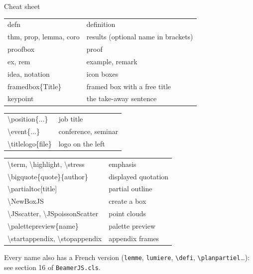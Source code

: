 \documentclass[night,charter,footer]{BeamerJS}
\begin{document}
\begin{frame}[allowframebreaks]{Cheat sheet}
	\small
	\par
		\begin{tabular}{@{}>{\ttfamily\small}l l@{}}
			defn & definition \\
			thm, prop, lemma, coro & results (optional name in brackets) \\
			proofbox & proof \\
			ex, rem & example, remark \\
			idea, notation & icon boxes \\
			framedbox\{Title\} & framed box with a free title \\
			keypoint & the take-away sentence \\
		\end{tabular}
	\medskip

	\par
		\begin{tabular}{@{}>{\ttfamily\small}l l@{}}
			\textbackslash position\{...\} & job title \\
			\textbackslash event\{...\} & conference, seminar \\
			\textbackslash titlelogo\{file\} & logo on the left \\
		\end{tabular}
	\medskip

	\framebreak

	\par
		\begin{tabular}{@{}>{\ttfamily\small}l l@{}}
			\textbackslash term, \textbackslash highlight, \textbackslash stress
				& emphasis \\
			\textbackslash bigquote\{quote\}\{author\} & displayed quotation \\
			\textbackslash partialtoc[title] & partial outline \\
			\textbackslash NewBoxJS & create a box \\
			\textbackslash JSscatter, \textbackslash JSpoissonScatter & point clouds \\
			\textbackslash palettepreview\{name\} & palette preview \\
			\textbackslash startappendix, \textbackslash stopappendix & appendix frames \\
		\end{tabular}
	\medskip

	\begin{rem}
		Every name also has a French version (\texttt{lemme}, \texttt{lumiere},
		\texttt{\textbackslash defi}, \texttt{\textbackslash planpartiel}…):
		see section 16 of \texttt{BeamerJS.cls}.
	\end{rem}
\end{frame}
\end{document}
